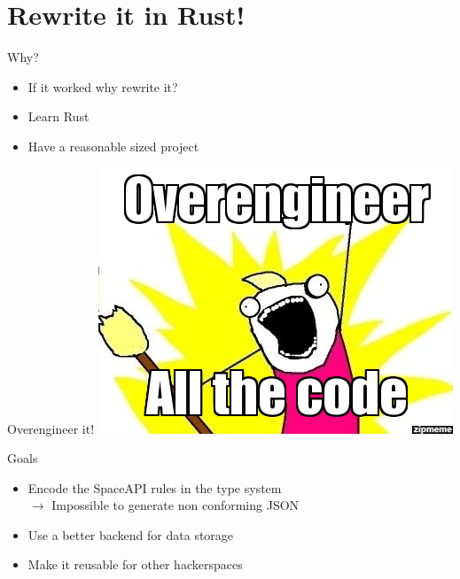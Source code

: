 \section{Rewrite it in Rust!}

\begin{frame}[c]{Why?}
    \begin{itemize}
        \item If it worked why rewrite it?
        \pause\item Learn Rust
        \item Have a reasonable sized project
    \end{itemize}
\end{frame}

\begin{frame}[c]{Overengineer it!}
    \centering
    \includegraphics[height=0.8\textheight]{./spaceapi_in_rust/overengineer_all_the_things.jpg}
\end{frame}

\begin{frame}[c]{Goals}
    \begin{itemize}
        \item Encode the SpaceAPI rules in the type system \\
            $\rightarrow$ Impossible to generate non conforming JSON
        \item Use a better backend for data storage
        \item Make it reusable for other hackerspaces
    \end{itemize}
\end{frame}

